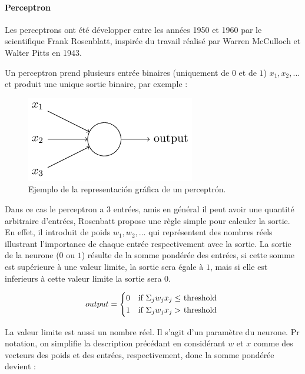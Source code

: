 \documentclass[conference,onecolumn]{IEEEtran}
\begin{document}
\paragraph{Perceptron}
Les perceptrons ont été développer entre les années 1950 et 1960 par le scientifique Frank Rosenblatt, inspirée du travail réalisé par Warren McCulloch et Walter Pitts en 1943. 

Un perceptron prend plusieurs entrée binaires (uniquement de $0$ et de $1$) $x_1, x_2, ...$ et produit une unique sortie binaire, par exemple : 

 \begin{figure}[H]
 \centering
    \includegraphics[scale=0.5]{img9.png}
    \caption{Ejemplo de la representación gráfica de un perceptrón.}
\end{figure}

Dans ce cas le perceptron a 3 entrées, amis en général il peut avoir une quantité arbitraire d’entrées, Rosenbatt propose une règle simple pour calculer la sortie. En effet, il introduit de poids $w_1, w_2, ...$ qui représentent des nombres réels illustrant l’importance de chaque entrée respectivement avec la sortie. La sortie de la neurone ($0$ ou $1$)  résulte de la somme pondérée des entrées, si cette somme est supérieure à une valeur limite, la sortie sera égale à $1$, mais si elle est inferieurs à cette valeur limite la sortie sera $0$. 

\begin{equation}
    output =
    \begin{cases*}
      0 & if $\Sigma_j w_jx_j \leq $ threshold \\
      1 & if $\Sigma_j w_jx_j > $ threshold \\
    \end{cases*}
\end{equation}

La valeur limite est aussi un nombre réel. Il s’agit d’un paramètre du neurone. Pr notation, on simplifie la description précédant en considérant $w$ et $x$ comme des vecteurs des poids et des entrées, respectivement, donc la somme pondérée devient : 
\end{document}
